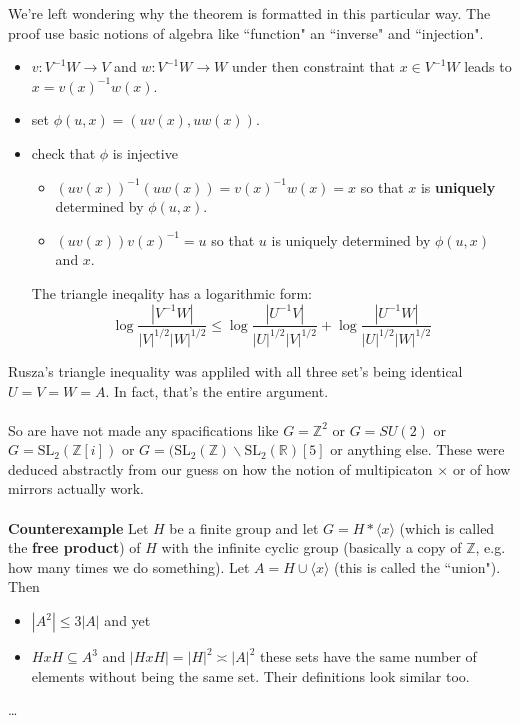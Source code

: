 \documentclass[12pt]{article}
\begin{document}
{We're left wondering why the theorem is formatted in this particular way.  The proof use basic notions of algebra like ``function" an  ``inverse" and ``injection".
\begin{itemize}
\item $v : V^{-1} W \to V$ and $w : V^{-1} W \to W$ under then constraint 
that $x \in V^{-1}W$ leads to $x = v(x)^{-1} w(x)$.  
\item set $\phi(u,x) = (uv(x), uw(x))$.
\item check that $\phi$ is injective
\begin{itemize}
\item $(uv(x))^{-1} (uw(x)) = v(x)^{-1} w(x) = x $ so that $x$ is {\color{red}\textbf{uniquely}} determined by $\phi(u,x)$.  
\item $(uv(x)) v(x)^{-1} = u $ so that $u$ is uniquely determined by $\phi(u,x)$ and $x$.
\end{itemize}
The triangle ineqality has a logarithmic form:
$$ \log \frac{|V^{-1}W|}{|V|^{1/2}|W|^{1/2}} 
\leq \log \frac{|U^{-1}V|}{|U|^{1/2}|V|^{1/2}} + \log \frac{|U^{-1}W|}{|U|^{1/2}|W|^{1/2}}$$
\end{itemize}
Rusza's triangle inequality was appliled with all three set's being identical $U = V = W = A$.  In fact, that's the entire argument. \\ \\
So are have not made any spacifications like $G = \mathbb{Z}^2$ or $G = SU(2)$ or $G = \text{SL}_2(\mathbb{Z}[i])$ or $G = (\text{SL}_2(\mathbb{Z}) \backslash \text{SL}_2(\mathbb{R})[5]$ or anything else.  These were deduced abstractly from our guess on how the notion of multipicaton $\times$ or of how mirrors actually work. \\ \\
\textbf{Counterexample} Let $H$ be a finite group and let $G = H \ast \langle x \rangle$ (which is called the \textbf{free product}) of $H$ with the infinite cyclic group (basically a copy of $\mathbb{Z}$, e.g. how many times we do something).  Let $A = H \cup \langle x \rangle$ (this is called the ``union").  Then 
\begin{itemize}
\item $|A^2| \leq 3 |A|$ and yet
\item $HxH \subseteq A^3$ and $|HxH| = |H|^2 \asymp |A|^2$ these sets have the same number of elements without being the same set.  Their definitions look similar too.
\end{itemize}

\vfill

\begin{thebibliography}{}

\item \dots 

\end{thebibliography}
}
\end{document}
